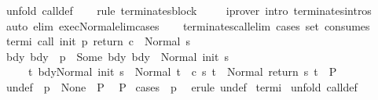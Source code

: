\begin{isabellebody}
\isamarkupfalse%
\ {\isacharparenleft}unfold\ call{\isacharunderscore}def{\isacharparenright}\isanewline
\ \ \isamarkupfalse%
\ {\isacharparenleft}rule\ terminates{\isacharunderscore}block{\isacharparenright}\isanewline
\ \ \isamarkupfalse%
\ \ {\isacharparenleft}iprover\ intro{\isacharcolon}\ terminates{\isachardot}intros{\isacharparenright}\isanewline
\ \ \isamarkupfalse%
\ {\isacharparenleft}auto\ elim{\isacharcolon}\ exec{\isacharunderscore}Normal{\isacharunderscore}elim{\isacharunderscore}cases{\isacharparenright}\isanewline
\ \ \isamarkupfalse%
%
\endisatagproof
{\isafoldproof}%
%
\isadelimproof
\isanewline
%
\endisadelimproof
\isanewline
{}\isamarkupfalse%
\ terminates{\isacharunderscore}call{\isacharunderscore}elim\ {\isacharbrackleft}cases\ set{\isacharcomma}\ consumes\ {}{\isacharbrackright}{\isacharcolon}\isanewline
{}\ termi{\isacharcolon}\ {\isachardoublequoteopen}{\isasymGamma}{\isasymturnstile}call\ init\ p\ return\ c\ {\isasymdown}\ Normal\ s{\isachardoublequoteclose}\isanewline
{}\ bdy{\isacharcolon}\ {\isachardoublequoteopen}{\isasymAnd}bdy{\isachardot}\ {\isasymlbrakk}{\isasymGamma}\ p\ {\isacharequal}\ Some\ bdy{\isacharsemicolon}\ {\isasymGamma}{\isasymturnstile}bdy\ {\isasymdown}\ Normal\ {\isacharparenleft}init\ s{\isacharparenright}{\isacharsemicolon}\ \isanewline
\ \ \ \ \ {\isasymforall}t{\isachardot}\ {\isasymGamma}{\isasymturnstile}{\isasymlangle}bdy{\isacharcomma}Normal\ {\isacharparenleft}init\ s{\isacharparenright}{\isasymrangle}\ {\isasymRightarrow}\ Normal\ t\ {\isasymlongrightarrow}\ {\isasymGamma}{\isasymturnstile}c\ s\ t\ {\isasymdown}\ Normal\ {\isacharparenleft}return\ s\ t{\isacharparenright}{\isasymrbrakk}\ {\isasymLongrightarrow}\ P{\isachardoublequoteclose}\isanewline
{}\ undef{\isacharcolon}\ {\isachardoublequoteopen}{\isasymlbrakk}{\isasymGamma}\ p\ {\isacharequal}\ None{\isasymrbrakk}\ {\isasymLongrightarrow}\ P{\isachardoublequoteclose}\ \isanewline
{}\ P\isanewline
%
\isadelimproof
%
\endisadelimproof
%
\isatagproof
{}\isamarkupfalse%
\ {\isacharparenleft}cases\ {\isachardoublequoteopen}{\isasymGamma}\ p{\isachardoublequoteclose}{\isacharparenright}\isanewline
{}\isamarkupfalse%
\ \ {\isacharparenleft}erule\ undef{\isacharparenright}\isanewline
{}\isamarkupfalse%
\ termi\isanewline
{}\isamarkupfalse%
\ {\isacharparenleft}unfold\ call{\isacharunderscore}def{\isacharparenright}\isanewline

\end{isabellebody}
